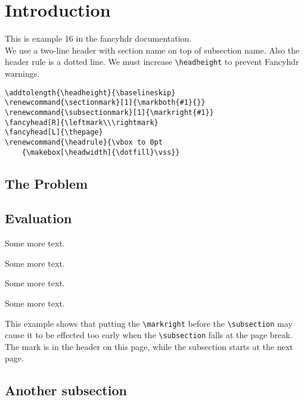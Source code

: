 \documentclass{article}
\renewcommand{\sectionmark}[1]{\markboth{#1}{}}
\renewcommand{\subsectionmark}[1]{\markright{#1}}
\renewcommand{\headrule}{\vbox to 0pt
    {\makebox[\headwidth]{\dotfill}\vss}}
\begin{document}
\tableofcontents

\section{Introduction}

\begin{boxedminipage}{\textwidth}
This is example 16 in the fancyhdr documentation.\\
We use a two-line header with section name on top of subsection name. Also the header rule is a dotted line. We must increase \verb|\headheight| to prevent Fancyhdr warnings.
\begin{verbatim}
\addtolength{\headheight}{\baselineskip}
\renewcommand{\sectionmark}[1]{\markboth{#1}{}}
\renewcommand{\subsectionmark}[1]{\markright{#1}}
\fancyhead[R]{\leftmark\\\rightmark}
\fancyhead[L]{\thepage}
\renewcommand{\headrule}{\vbox to 0pt
    {\makebox[\headwidth]{\dotfill}\vss}}
\end{verbatim}
\end{boxedminipage}

\subsection{The Problem}
\label{sec:problem}

\lipsum[1]

\subsection{Evaluation}

\lipsum

Some more text.

Some more text.

Some more text.

Some more text.

This example shows that putting the \verb+\markright+ before the \verb+\subsection+ may cause it to be effected too early when the \verb+\subsection+ falls at the page break. The mark is in the header on this page, while the subsection starts at the next page.


\subsection{Another subsection}

\lipsum[3]
\end{document}
